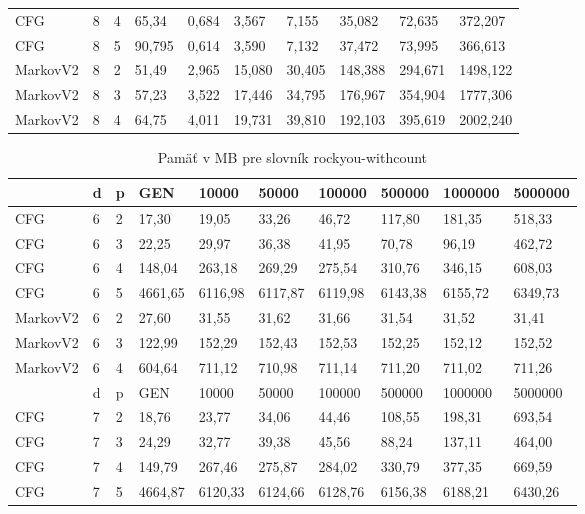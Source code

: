 \begin{table}[]
\begin{tabular}{lll|lllllll}
CFG    & 8 & 4 & 65,34   & 0,684  & 3,567  & 7,155  & 35,082 & 72,635  & 372,207 \\
CFG    & 8 & 5 & 90,795 & 0,614 & 3,590 & 7,132 & 37,472 & 73,995 & 366,613 \\
MarkovV2 & 8 & 2 & 51,49     & 2,965  & 15,080  & 30,405  & 148,388  & 294,671  & 1498,122 \\
MarkovV2 & 8 & 3 & 57,23     & 3,522  & 17,446  & 34,795 & 176,967 & 354,904  & 1777,306 \\
MarkovV2 & 8 & 4 & 64,75     & 4,011 & 19,731 & 39,810 & 192,103 & 395,619  & 2002,240
\end{tabular}
\end{table}

\begin{table}[]
\centering
\caption{Pamäť v MB pre slovník rockyou-withcount}
\label{tbl:rockyouMemory}
\begin{tabular}{lll|lllllll}
       & d & p & GEN     & 10000  & 50000  & 100000 & 500000 & 1000000 & 5000000 \\ \hline
CFG    & 6 & 2 & 17,30   & 19,05  & 33,26  & 46,72  & 117,80 & 181,35  & 518,33 \\
CFG    & 6 & 3 & 22,25    & 29,97  & 36,38  & 41,95  & 70,78 & 96,19  & 462,72 \\
CFG    & 6 & 4 & 148,04   & 263,18  & 269,29   & 275,54  & 310,76 & 346,15  & 608,03 \\
CFG    & 6 & 5 & 4661,65 & 6116,98 & 6117,87 & 6119,98 & 6143,38 & 6155,72 & 6349,73 \\
MarkovV2 & 6 & 2 & 27,60     & 31,55  & 31,62  & 31,66  & 31,54 & 31,52  & 31,41 \\
MarkovV2 & 6 & 3 & 122,99     & 152,29  & 152,43  & 152,53  & 152,25 & 152,12 & 152,52 \\
MarkovV2 & 6 & 4 & 604,64     & 711,12  & 710,98  & 711,14 & 711,20 & 711,02 & 711,26 \\ \hline
       & d & p & GEN     & 10000  & 50000  & 100000 & 500000 & 1000000 & 5000000 \\ \hline
CFG    & 7 & 2 & 18,76    & 23,77  & 34,06  & 44,46  & 108,55  & 198,31  & 693,54 \\
CFG    & 7 & 3 & 24,29   & 32,77   & 39,38  & 45,56  & 88,24 & 137,11  & 464,00 \\
CFG    & 7 & 4 & 149,79   & 267,46  & 275,87  & 284,02  & 330,79 & 377,35  & 669,59 \\
CFG    & 7 & 5 & 4664,87 & 6120,33 & 6124,66 & 6128,76 & 6156,38 & 6188,21 & 6430,26 \\

\end{tabular}
\end{table}
